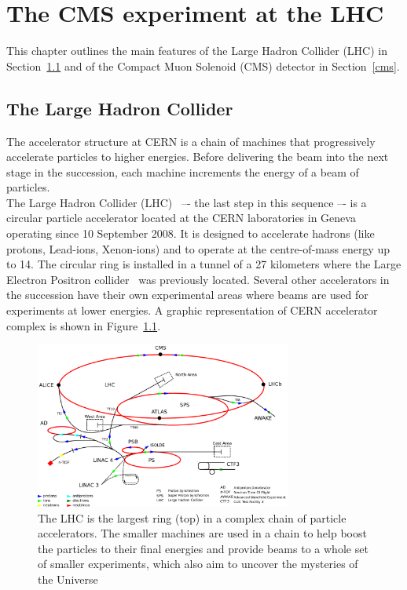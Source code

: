 \chapter{The CMS experiment at the LHC} \label{Chapter2} 



This chapter outlines the main features of the Large
Hadron Collider (LHC) in Section~\ref{lhc} and of the Compact Muon Solenoid (CMS)
detector in Section~\ref{cms}. 



\section{The Large Hadron Collider}\label{lhc}
The accelerator structure at CERN is a chain of machines that
progressively accelerate particles to higher energies. Before delivering the beam into the next stage in the succession, each machine
increments the energy of a beam of particles.\\
The Large Hadron Collider (LHC)~\cite{Brning2004LHCDR} –- the last step in this sequence –- is a circular particle accelerator
located at the CERN laboratories in Geneva operating since 10
September 2008. It is
designed to accelerate hadrons (like protons, Lead-ions, Xenon-ions) and to
operate at the centre-of-mass energy up to 14\TeV.
The circular ring is installed in a tunnel of a 27 kilometers where
the Large Electron Positron collider~\cite{Lep:designReport} was
previously located. Several other accelerators in the succession have
their own experimental areas where beams are used for experiments at lower energies.
A graphic representation of CERN accelerator
complex is shown in Figure~\ref{fig:cern}. 

\begin{figure}[h]
\centering
\includegraphics[width=0.75\textwidth]{Figures/c2/Cern-accelerator-complex.png}
\vspace*{3mm}
\caption{The LHC is the largest ring (top) in a complex chain of particle accelerators. The smaller machines are used in a chain to help boost the particles to their final energies and provide beams to a whole set of smaller experiments, which also aim to uncover the mysteries of the Universe~\cite{Mobs:2197559}}
\label{fig:cern}
\end{figure}

